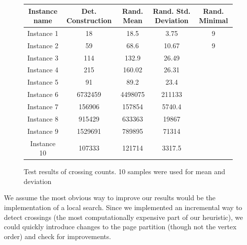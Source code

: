 \documentclass [11pt]{article}
\begin{document}
\begin{figure}[H]
\centering
  \begin{tabular}{| c | c | c | c | c |}
\hline
Instance name & Det. Construction & Rand. Mean & Rand. Std. Deviation & Rand. Minimal\\
\hline
Instance 1 & 18 & 18.5 & 3.75 & 9\\
\hline 
Instance 2 & 59 & 68.6 & 10.67 &9\\
\hline 
Instance 3 & 114 & 132.9 & 26.49 &\\
\hline 
Instance 4 & 215 & 160.02 & 26.31 &\\
\hline 
Instance 5 & 91 & 89.2  & 23.4 &\\
\hline 
Instance 6 & 6732459 & 4498075 & 211133 &\\
\hline 
Instance 7 & 156906 & 157854 & 5740.4 & \\
\hline 
Instance 8 & 915429 & 633363 & 19867 & \\
\hline 
Instance 9 & 1529691 & 789895 & 71314 & \\
\hline 
Instance 10 & 107333 & 121714 & 3317.5 &  \\
\hline 
\end{tabular}
\caption{Test results of crossing counts.  10 samples were used for mean and deviation}
\end{figure}




We assume the most obvious way to improve our results would be the implementation of a local search. Since we implemented an incremental way to detect crossings (the most computationally expensive part of our heuristic), we could quickly introduce changes to the page partition (though not the vertex order) and check for improvements. 
\end{document}
